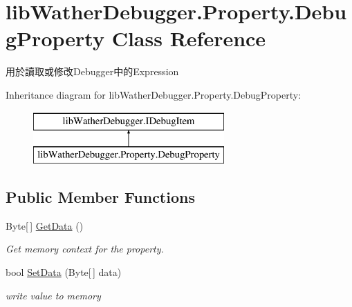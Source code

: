 \hypertarget{classlib_wather_debugger_1_1_property_1_1_debug_property}{\section{lib\+Wather\+Debugger.\+Property.\+Debug\+Property Class Reference}
\label{classlib_wather_debugger_1_1_property_1_1_debug_property}
}


用於讀取或修改\+Debugger中的\+Expression  


Inheritance diagram for lib\+Wather\+Debugger.\+Property.\+Debug\+Property\+:\begin{figure}[H]
\begin{center}
\leavevmode
\includegraphics[height=2.000000cm]{classlib_wather_debugger_1_1_property_1_1_debug_property}
\end{center}
\end{figure}
\subsection*{Public Member Functions}
\begin{DoxyCompactItemize}
\item 
Byte\mbox{[}$\,$\mbox{]} \hyperlink{classlib_wather_debugger_1_1_property_1_1_debug_property_afa00b04629530c323782d91f9da13002}{Get\+Data} ()
\begin{DoxyCompactList}\small\item\em Get memory context for the property. \end{DoxyCompactList}\item 
bool \hyperlink{classlib_wather_debugger_1_1_property_1_1_debug_property_a72302f99b6429186203201aff06edb8f}{Set\+Data} (Byte\mbox{[}$\,$\mbox{]} data)
\begin{DoxyCompactList}\small\item\em write value to memory \end{DoxyCompactList}\end{DoxyCompactItemize}
